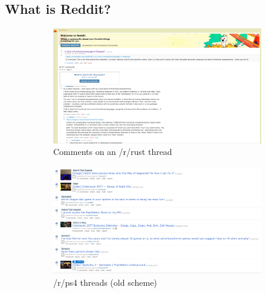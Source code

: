 \documentclass[12pt, a4paper]{article}
\begin{document}
\subsection{What is Reddit?}
\begin{figure}[ht!]
  \centering
  \begin{subfigure}[b]{0.4\linewidth}
    \includegraphics[width=\linewidth]{reddit_rust_comments.png}
    \caption{Comments on an /r/rust thread}
  \end{subfigure}
  \begin{subfigure}[b]{0.4\linewidth}
    \includegraphics[width=\linewidth]{reddit_ps4.png}
    \caption{/r/ps4 threads (old scheme)}
  \end{subfigure}
  \begin{subfigure}[b]{0.4\linewidth}

\end{subfigure}
\end{figure}
\end{document}
